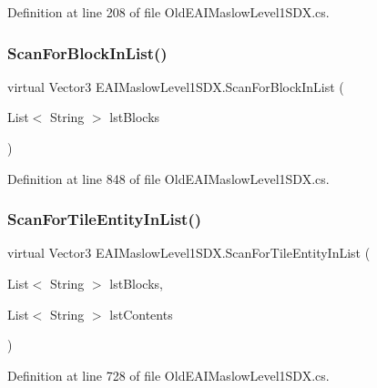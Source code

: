 Definition at line 208 of file Old\+E\+A\+I\+Maslow\+Level1\+S\+D\+X.\+cs.

\mbox{\label{class_e_a_i_maslow_level1_s_d_x_a3a7a46cd66886329924c53823a9b55cc}} 
\subsubsection{\texorpdfstring{ScanForBlockInList()}{ScanForBlockInList()}}
{\footnotesize\ttfamily virtual Vector3 E\+A\+I\+Maslow\+Level1\+S\+D\+X.\+Scan\+For\+Block\+In\+List (\begin{DoxyParamCaption}\item[{List$<$ String $>$}]{lst\+Blocks }\end{DoxyParamCaption})\hspace{0.3cm}{\ttfamily [virtual]}}



Definition at line 848 of file Old\+E\+A\+I\+Maslow\+Level1\+S\+D\+X.\+cs.

\mbox{\label{class_e_a_i_maslow_level1_s_d_x_a4da7fa23edca737091a05a5f9926bc9c}} 
\subsubsection{\texorpdfstring{ScanForTileEntityInList()}{ScanForTileEntityInList()}}
{\footnotesize\ttfamily virtual Vector3 E\+A\+I\+Maslow\+Level1\+S\+D\+X.\+Scan\+For\+Tile\+Entity\+In\+List (\begin{DoxyParamCaption}\item[{List$<$ String $>$}]{lst\+Blocks,  }\item[{List$<$ String $>$}]{lst\+Contents }\end{DoxyParamCaption})\hspace{0.3cm}{\ttfamily [virtual]}}



Definition at line 728 of file Old\+E\+A\+I\+Maslow\+Level1\+S\+D\+X.\+cs.

\mbox{\label{class_e_a_i_maslow_level1_s_d_x_a9bb6f80930f3f77ab6dcf9018def6dbf}} 
